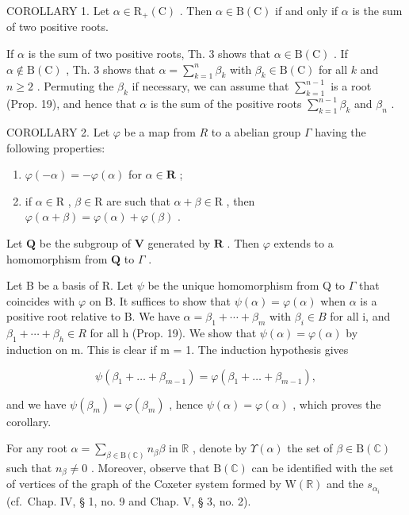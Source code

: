 COROLLARY 1. Let \(\alpha \in \mathrm{R}_{+}(\mathrm{C})\) . Then \(\alpha \in \mathrm{B}(\mathrm{C})\) if and only if \(\alpha\) is the sum of two positive roots.

If \(\alpha\) is the sum of two positive roots, Th. 3 shows that \(\alpha \in \mathrm{B}(\mathrm{C})\) . If \(\alpha \notin \mathrm{B}(\mathrm{C})\) , Th. 3 shows that \(\alpha = \sum_{k=1}^{n} \beta_k\) with \(\beta_k \in \mathrm{B}(\mathrm{C})\) for all \(k\) and \(n \geqslant 2\) . Permuting the \(\beta_k\) if necessary, we can assume that \(\sum_{k=1}^{n-1}\) is a root (Prop. 19), and hence that \(\alpha\) is the sum of the positive roots \(\sum_{k=1}^{n-1} \beta_k\) and \(\beta_n\) .

COROLLARY 2. Let \(\varphi\) be a map from \(R\) to a abelian group \(\Gamma\) having the following properties:

\begin{enumerate}
\def\labelenumi{\arabic{enumi})}
\item
  \(\varphi(-\alpha) = -\varphi(\alpha)\) for \(\alpha \in \mathbf{R}\) ;
\item
  if \(\alpha \in \mathrm{R}\) , \(\beta \in \mathrm{R}\) are such that \(\alpha + \beta \in \mathrm{R}\) , then \(\varphi(\alpha + \beta) = \varphi(\alpha) + \varphi(\beta)\) .
\end{enumerate}

Let \(\mathbf{Q}\) be the subgroup of \(\mathbf{V}\) generated by \(\mathbf{R}\) . Then \(\varphi\) extends to a homomorphism from \(\mathbf{Q}\) to \(\Gamma\) .

Let B be a basis of R. Let \(\psi\) be the unique homomorphism from Q to \(\Gamma\) that coincides with \(\varphi\) on B. It suffices to show that \(\psi(\alpha) = \varphi(\alpha)\) when \(\alpha\) is a positive root relative to B. We have \(\alpha = \beta_{1} + \cdots + \beta_{m}\) with \(\beta_{i} \in B\) for all i, and \(\beta_{1} + \cdots + \beta_{h} \in R\) for all h (Prop. 19). We show that \(\psi(\alpha) = \varphi(\alpha)\) by induction on m. This is clear if m = 1. The induction hypothesis gives

\[
\psi \left(\beta_ {1} + \dots + \beta_ {m - 1}\right) = \varphi \left(\beta_ {1} + \dots + \beta_ {m - 1}\right),
\]

and we have \(\psi (\beta_m) = \varphi (\beta_m)\) , hence \(\psi (\alpha) = \varphi (\alpha)\) , which proves the corollary.

For any root \(\alpha = \sum_{\beta \in \mathrm{B}(\mathbb{C})} n_{\beta} \beta\) in \(\mathbb{R}\) , denote by \(\Upsilon(\alpha)\) the set of \(\beta \in \mathrm{B}(\mathbb{C})\) such that \(n_{\beta} \neq 0\) . Moreover, observe that \(\mathrm{B}(\mathbb{C})\) can be identified with the set of vertices of the graph of the Coxeter system formed by \(\mathrm{W}(\mathbb{R})\) and the \(s_{\alpha_i}\) (cf.~Chap. IV, § 1, no. 9 and Chap. V, § 3, no. 2).

